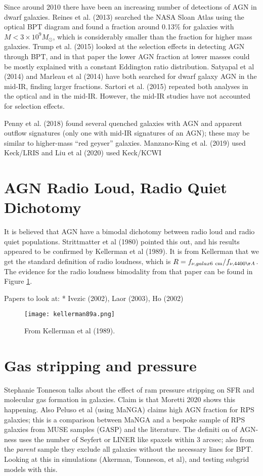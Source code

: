 \documentclass[11pt, preprint]{aastex}
\begin{document}
Since around 2010 there have been an increasing number of detections
of AGN in dwarf galaxies.  Reines et al. (2013) searched the NASA
Sloan Atlas using the optical BPT diagram and found a fraction around
0.13\% for galaxies with $M<3\times 10^9 M_\odot$, which is
considerably smaller than the fraction for higher mass galaxies.
Trump et al. (2015) looked at the selection effects in detecting AGN
through BPT, and in that paper the lower AGN fraction at lower masses
could be mostly explained with a constant Eddington ratio
distribution. Satyapal et al (2014) and Marleau et al (2014) have both
searched for dwarf galaxy AGN in the mid-IR, finding larger
fractions. Sartori et al. (2015) repeated both analyses in the optical
and in the mid-IR. However, the mid-IR studies have not accounted for
selection effects.

Penny et al. (2018) found several quenched galaxies with AGN and
apparent outflow signatures (only one with mid-IR signatures of an
AGN); these may be similar to higher-mass ``red geyser'' galaxies.
Manzano-King et al. (2019) used Keck/LRIS and Liu et al (2020) used
Keck/KCWI 

\section{AGN Radio Loud, Radio Quiet Dichotomy}

It is believed that AGN have a bimodal dichotomy between radio loud
and radio quiet populations.  Strittmatter et al (1980) pointed this
out, and his results appeared to be confirmed by Kellerman et al
(1989). It is from Kellerman that we get the standard definition of
radio loudness, which is $R = f_{\nu,galax {\rm 6~cm}} / f_{\nu,
  4400\AA}$. The evidence for the radio loudness bimodality from that
paper can be found in Figure \ref{fig:kellerman89a}.

Papers to look at:
 * Ivezic (2002), Laor (2003), Ho (2002)

\begin{figure}
  \texttt{[image: kellerman89a.png]}
  \caption{\label{fig:kellerman89a} From Kellerman et al (1989).}
\end{figure}

\section{Gas stripping and pressure}

Stephanie Tonneson talks about the effect of ram pressure stripping on
SFR and molecular gas formation in galaxies. Claim is that Moretti
2020 shows this happening. Also Peluso et al (using MaNGA) claims high
AGN fraction for RPS galaxies; this is a comparison between MaNGA and
a bespoke sample of RPS galaxies from MUSE samples (GASP) and the
literature. The definiti on of AGN-ness uses the number of Seyfert or
LINER like spaxels within 3 arcsec; also from the {\it parent} sample
they exclude all galaxies without the necessary lines for BPT. Looking
at this in simulations (Akerman, Tonneson, et al), and testing subgrid
models with this.
\end{document}
